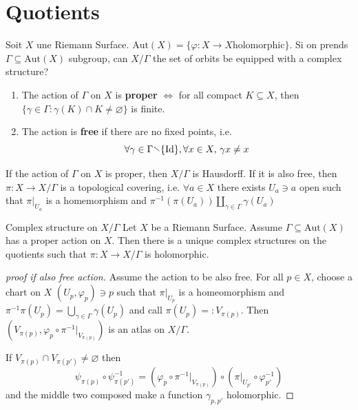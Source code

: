 \chapter{Quotients}
Soit \(X\) une Riemann Surface. \(\mathrm{Aut}{(X)} = \{\varphi : X \to X \text{
holomorphic}\}\). Si on prends \(\Gamma \subseteq \mathrm{Aut}{(X)} \) subgroup,
can \(X / \Gamma\) the set of orbits be equipped with a complex structure?

\begin{definition}{}
\begin{enumerate}[label = \arabic*.]
    \item The action of \(\Gamma\) on \(X\) is \textbf{proper} \(\iff\) for all
        compact \(K \subseteq X \), then \(\{\gamma \in \Gamma : \gamma {(K)}
        \cap K \neq \varnothing\} \) is finite.
    \item The action is \textbf{free} if there are no fixed points, i.e.
        \[\forall \gamma \in \Gamma \sminus \{\mathrm{Id}\}, \forall x \in X, \,
        \gamma x \neq x\]
\end{enumerate}
\end{definition}

\begin{proposition}{}
    If the action of \(\Gamma\) on \(X\) is proper, then \(X / \Gamma\) is
    Hausdorff. If it is also free, then \(\pi : X \to X / \Gamma\) is a
    topological covering, i.e. \(\forall a \in X\) there exists \(U_a \ni a\)
    open such that \(\pi|_{U_a} \) is a homemorphism and \(\pi
    ^{-1}{(\pi{(U_a)})} \coprod_{\gamma \in \Gamma} \gamma {(U_a)}\) 
\end{proposition}

\begin{theorem}{Complex structure on \(X / \Gamma\)
    }\label{thm:struct_on_quotient}
    Let \(X\) be a Riemann Surface. Assume \(\Gamma \subseteq \mathrm{Aut}{(X)}
    \) has a proper action on \(X\). Then there is a unique complex structures
    on the quotients such that \(\pi : X \to X / \Gamma\) is holomorphic.
\end{theorem}

\begin{proof}[proof if also free action]
Assume the action to be also free. For all \(p \in X\), choose a chart on \(X\)
\({(U_p, \varphi _p)} \ni p\) such that \(\pi|_{U_p} \) is a homeomorphism and
\(\pi ^{-1} \pi{(U_p)} = \bigcup_{\gamma \in  \Gamma} \gamma{(U_p)}\) and call
\(\pi{(U_p)} =: V_{\pi{(p)}} \). Then \({(V_{\pi{(p)}}, \varphi _p \circ \pi
^{-1}|_{V_{\pi{(p)}} } )}\) is an atlas on \(X / \Gamma\).
    
If \(V_{\pi{(p)}} \cap V_{\pi{(p')}} \neq \varnothing\) then
\[\psi_{\pi{(p)}} \circ \psi ^{-1}_{\pi{(p')}} = {\left( \varphi _p \circ \pi
^{-1}|_{V_{\pi{(p)}} }  \right)} \circ {\left( \pi|_{U_{p'} } \circ \varphi
^{-1}_{p'}   \right)}  \]
and the middle two composed make a function \(\gamma_{p, p'} \) holomorphic.
\end{proof}

